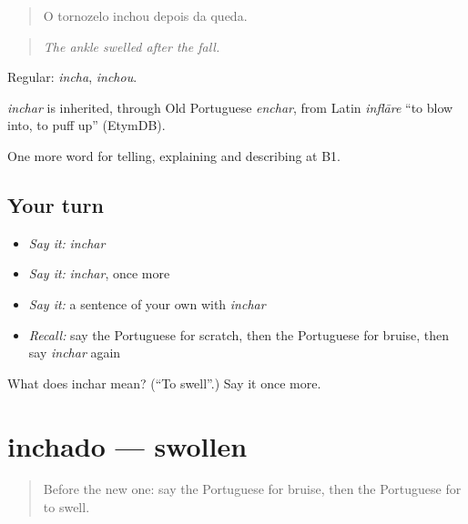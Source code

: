 \begin{quote}
O tornozelo inchou depois da queda.
\end{quote}

\begin{quote}
\emph{The ankle swelled after the fall.}
\end{quote}

Regular: \emph{incha}, \emph{inchou}.

\begin{cousinweb}
\emph{inchar} is inherited, through Old Portuguese \emph{enchar}, from Latin \emph{inflāre} \textquotedblleft{}to blow into, to puff up\textquotedblright{} (EtymDB).
\end{cousinweb}

\begin{grammarlens}[title={What you've built}]
One more word for telling, explaining and describing at B1.
\end{grammarlens}

\subsection*{Your turn}
\begin{itemize}
\raggedright
  \item \emph{Say it:} \emph{inchar}
  \item \emph{Say it:} \emph{inchar}, once more
  \item \emph{Say it:} a sentence of your own with \emph{inchar}
  \item \emph{Recall:} say the Portuguese for scratch, then the Portuguese for bruise, then say \emph{inchar} again
\end{itemize}

\begin{tcolorbox}[breakable,colback=teal!4,colframe=teal!35!black,title={Before you move on}]
What does inchar mean? (\textquotedblleft{}To swell\textquotedblright{}.) Say it once more.
\end{tcolorbox}
\section[inchado]{inchado — swollen}

\label{lesson:PT-C485-inchado}



\begin{quote}
Before the new one: say the Portuguese for bruise, then the Portuguese for to swell.
\end{quote}

